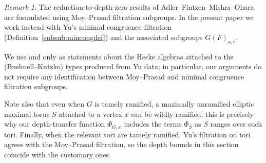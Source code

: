 \documentclass[american]{article}
\numberwithin{equation}{section}
\numberwithin{figure}{section}
\theoremstyle{plain}
\theoremstyle{definition}
\theoremstyle{remark}
\newtheorem{remark}[theorem]{Remark}
\begin{document}
\begin{remark}\label{rem:AFMO-filtrations}
The reduction-to-depth-zero results of Adler--Fintzen--Mishra--Ohara \cite{AFMO24a,AFMO24b}
are formulated using Moy--Prasad filtration subgroups. In the present paper we work instead with
Yu's minimal congruence filtration (Definition~\ref{subsub:mincongdef}) and the associated subgroups $G(F)_{x,r}$.

We use \cite[Theorem~4.4.1]{AFMO24a} and \cite[Theorem~5.3.6]{AFMO24b} only as statements about the
Hecke algebras attached to the (Bushnell--Kutzko) types produced from Yu data; in particular, our
arguments do not require any identification between Moy--Prasad and minimal congruence filtration
subgroups.

Note also that even when $G$ is tamely ramified, a maximally unramified elliptic maximal torus
$S$ attached to a vertex $x$ can be wildly ramified; this is precisely why our depth-transfer
function $\Phi_{G,x}$ includes the terms $\Phi_S$ as $S$ ranges over such tori.
Finally, when the relevant tori are tamely ramified, Yu's filtration on tori agrees with the
Moy--Prasad filtration, so the depth bounds in this section coincide with the
customary ones.
\end{remark}
\end{document}
